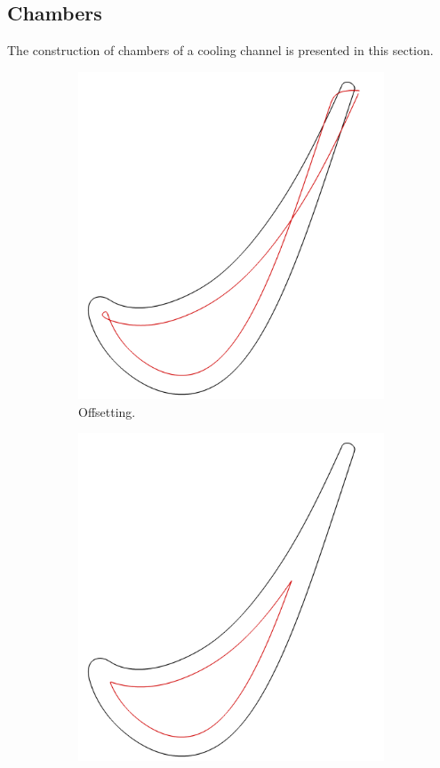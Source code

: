 \documentclass[a4paper, 11pt]{report}
\theoremstyle{definition}
\begin{document}
\subsection{Chambers}\label{sec:chambers}
	The construction of chambers of a cooling channel is presented in this section.

	\begin{figure}[H]
		\centering
		\begin{subfigure}{.32\textwidth}
			\includegraphics[width=\textwidth]{../tec/shrinking/11.png}
			\caption{Offsetting.}
		\end{subfigure}
		\begin{subfigure}{.32\textwidth}
			\includegraphics[width=\textwidth]{../tec/shrinking/12.png}

\end{subfigure}
\end{figure}
\end{document}
